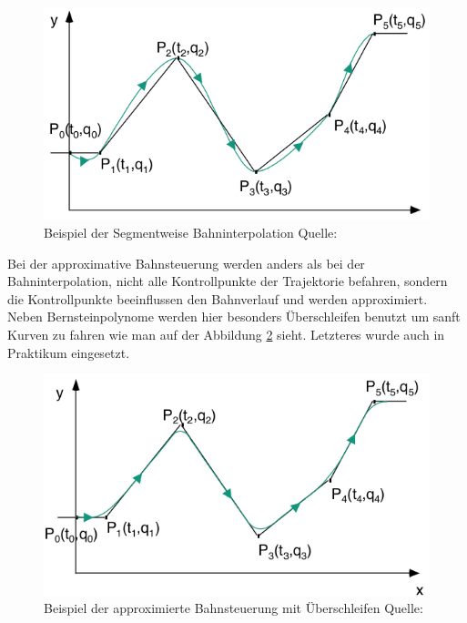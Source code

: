 \begin{figure}[h]
	\center
	\includegraphics[scale=0.35]{graphics/segmentinterpolation.png}
	\caption{\label{fig:segmentinterpolation} Beispiel der Segmentweise Bahninterpolation Quelle: \citep{rob1}}
\end{figure}
 
 
 Bei der approximative Bahnsteuerung werden anders als bei der Bahninterpolation, nicht alle Kontrollpunkte der Trajektorie befahren, sondern die Kontrollpunkte beeinflussen den Bahnverlauf und werden approximiert. Neben Bernsteinpolynome werden hier besonders Überschleifen benutzt um sanft Kurven zu fahren wie man auf der Abbildung \ref{fig:ueberschleifeninterpolation} sieht. Letzteres wurde auch in Praktikum eingesetzt.
 \begin{figure}[h]
\center
\includegraphics[scale=0.35]{graphics/ueberschleifeninterpolation.png}
\caption{\label{fig:ueberschleifeninterpolation} Beispiel der approximierte Bahnsteuerung mit Überschleifen Quelle: \citep{rob1}}
\end{figure}




